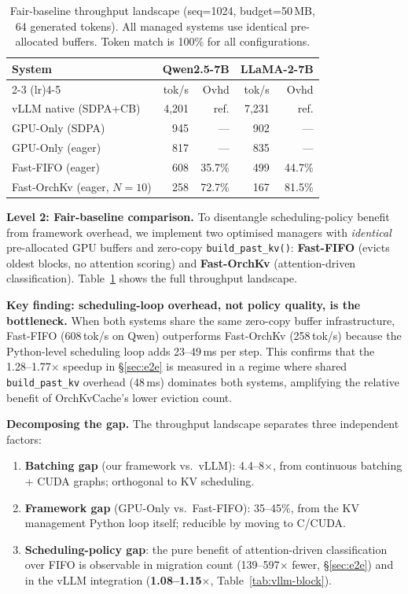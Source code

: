 \documentclass[conference]{IEEEtran}
\begin{document}
\begin{table}[t]
\centering
\caption{Fair-baseline throughput landscape (seq=1024, budget=50\,MB, 64 generated tokens). All managed systems use identical pre-allocated buffers. Token match is 100\% for all configurations.}
\label{tab:fair-baseline}
\footnotesize
\setlength{\tabcolsep}{9pt}
\begin{tabular}{@{}lrrrr@{}}
\toprule
System & \multicolumn{2}{c}{Qwen2.5-7B} & \multicolumn{2}{c}{LLaMA-2-7B} \\
\cmidrule(lr){2-3} \cmidrule(lr){4-5}
& tok/s & Ovhd & tok/s & Ovhd \\
\midrule
vLLM native (SDPA+CB)        & 4{,}201 & ref.   & 7{,}231 & ref. \\
GPU-Only (SDPA)               & 945     & ---    & 902     & ---  \\
GPU-Only (eager)              & 817     & ---    & 835     & ---  \\
Fast-FIFO (eager)             & 608     & 35.7\% & 499    & 44.7\% \\
Fast-OrchKv (eager, $N{=}10$) & 258     & 72.7\% & 167    & 81.5\% \\
\bottomrule
\end{tabular}
\end{table}

\textbf{Level 2: Fair-baseline comparison.} To disentangle scheduling-policy benefit from framework overhead, we implement two optimised managers with \emph{identical} pre-allocated GPU buffers and zero-copy \texttt{build\_past\_kv()}: \textbf{Fast-FIFO} (evicts oldest blocks, no attention scoring) and \textbf{Fast-OrchKv} (attention-driven classification). Table~\ref{tab:fair-baseline} shows the full throughput landscape.

\textbf{Key finding: scheduling-loop overhead, not policy quality, is the bottleneck.}
When both systems share the same zero-copy buffer infrastructure, Fast-FIFO (608\,tok/s on Qwen) outperforms Fast-OrchKv (258\,tok/s) because the Python-level scheduling loop adds 23--49\,ms per step. This confirms that the 1.28--1.77$\times$ speedup in \S\ref{sec:e2e} is measured in a regime where shared \texttt{build\_past\_kv} overhead (48\,ms) dominates both systems, amplifying the relative benefit of OrchKvCache's lower eviction count.

\textbf{Decomposing the gap.} The throughput landscape separates three independent factors:
\begin{enumerate}
\item \textbf{Batching gap} (our framework vs.\ vLLM): 4.4--8$\times$, from continuous batching + CUDA graphs; orthogonal to KV scheduling.
\item \textbf{Framework gap} (GPU-Only vs.\ Fast-FIFO): 35--45\%, from the KV management Python loop itself; reducible by moving to C/CUDA.
\item \textbf{Scheduling-policy gap}: the pure benefit of attention-driven classification over FIFO is observable in migration count (139--597$\times$ fewer, \S\ref{sec:e2e}) and in the vLLM integration (\textbf{1.08--1.15$\times$}, Table~\ref{tab:vllm-block}).
\end{enumerate}
\end{document}
